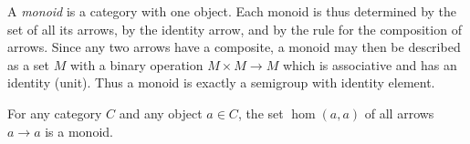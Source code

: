 A \emph{monoid} is a category with one object. Each monoid is thus determined by the set of all its arrows, by the identity arrow, and by the rule for the composition of arrows. Since any two arrows have a composite, a monoid may then be described as a set $M$ with a binary operation $M \times M \to M$ which is associative and has an identity (unit). Thus a monoid is exactly a semigroup with identity element.

For any category $C$ and any object $a \in C$, the set $\hom(a, a)$ of all arrows $a \to a$ is a monoid.

